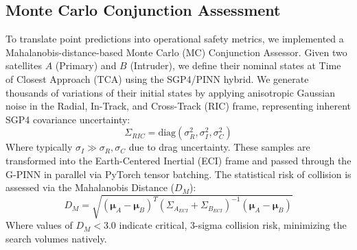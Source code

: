 \subsection{Monte Carlo Conjunction Assessment}
To translate point predictions into operational safety metrics, we implemented a Mahalanobis-distance-based Monte Carlo (MC) Conjunction Assessor.
Given two satellites $A$ (Primary) and $B$ (Intruder), we define their nominal states at Time of Closest Approach (TCA) using the SGP4/PINN hybrid.
We generate thousands of variations of their initial states by applying anisotropic Gaussian noise in the Radial, In-Track, and Cross-Track (RIC) frame, representing inherent SGP4 covariance uncertainty:
\begin{equation}
    \Sigma_{RIC} = \text{diag}(\sigma_R^2, \sigma_I^2, \sigma_C^2)
\end{equation}
Where typically $\sigma_I \gg \sigma_R, \sigma_C$ due to drag uncertainty.
These samples are transformed into the Earth-Centered Inertial (ECI) frame and passed through the G-PINN in parallel via PyTorch tensor batching.
The statistical risk of collision is assessed via the Mahalanobis Distance ($D_M$):
\begin{equation}
    D_M = \sqrt{ (\boldsymbol{\mu}_A - \boldsymbol{\mu}_B)^T (\Sigma_{A_{ECI}} + \Sigma_{B_{ECI}})^{-1} (\boldsymbol{\mu}_A - \boldsymbol{\mu}_B) }
\end{equation}
Where values of $D_M < 3.0$ indicate critical, 3-sigma collision risk, minimizing the search volumes natively.
